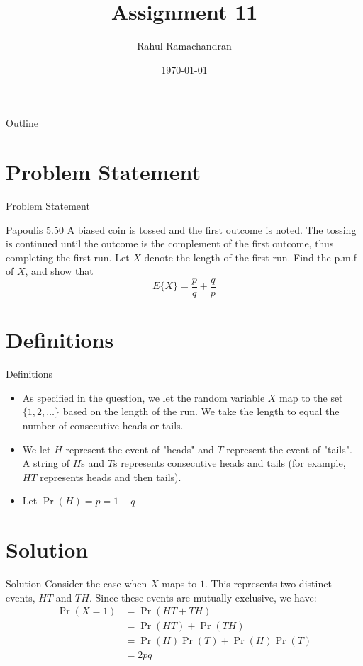\documentclass{beamer}
\title{Assignment 11}
\author{Rahul Ramachandran}
\date{\today}
\providecommand{\pr}[1]{\ensuremath{\Pr\left(#1\right)}}
\begin{document}
\begin{frame}
    \titlepage 
\end{frame}

\logo{}


\begin{frame}{Outline}
    \tableofcontents
\end{frame}



\section{Problem Statement}
\begin{frame}{Problem Statement}
    \begin{block}{Papoulis 5.50 } A biased coin is tossed and the first outcome is noted. The tossing is continued until the outcome is the complement of the first outcome, thus completing the first run. Let $X$ denote the length of the first run. Find the p.m.f of $X$, and show that   $$ E\{ X \} = \frac{p}{q} + \frac{q}{p}  $$   \end{block}
\end{frame}

\section{Definitions}
\begin{frame}{Definitions}
\begin{itemize}
    \item As specified in the question, we let the random variable $X$ map to the set $\{ 1,2, \ldots \}$ based on the length of the run. We take the length to equal the number of consecutive heads or tails.
    \item We let $H$ represent the event of "heads" and $T$ represent the event of "tails". A string of $H$s and $T$s represents consecutive heads and tails (for example, $HT$ represents heads and then tails).
    \item Let $\pr{H}=p = 1-q$ 
\end{itemize}

\end{frame}


\section{Solution}
\begin{frame}{Solution}
 Consider the case when $X$ maps to $1$. This represents two distinct events, $HT$ and $TH$. Since these events are mutually exclusive, we have:
 \begin{align}
     \pr{X=1} &= \pr{HT+TH} \\
              &= \pr{HT} + \pr{TH} \\
              &= \pr{H} \pr{T} + \pr{H} \pr{T} \\
              &= 2pq
 \end{align}
\end{frame}
\end{document}
